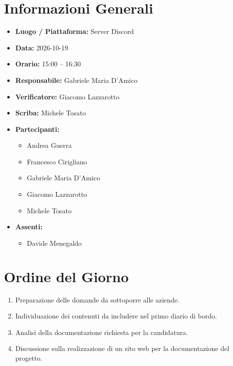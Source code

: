 \documentclass[11pt, a4paper]{article}
\newcommand{\DocDate}{2026-10-19}
\begin{document}
\section{Informazioni Generali}
\begin{itemize}
    \item \textbf{Luogo / Piattaforma:} Server Discord
    \item \textbf{Data:} \DocDate
    \item \textbf{Orario:} 15:00 -- 16:30
    \item \textbf{Responsabile:} Gabriele Maria D'Amico
    \item \textbf{Verificatore:} Giacomo Lazzarotto
    \item \textbf{Scriba:} Michele Tosato
    \item \textbf{Partecipanti:}
        \begin{itemize}
            \item Andrea Guerra
            \item Francesco Cirigliano
            \item Gabriele Maria D'Amico
            \item Giacomo Lazzarotto
            \item Michele Tosato
        \end{itemize}
    \item \textbf{Assenti:}
        \begin{itemize}
            \item Davide Menegaldo
        \end{itemize}
\end{itemize}

\clearpage

\section{Ordine del Giorno}
\begin{enumerate}
    \item Preparazione delle domande da sottoporre alle aziende.
    \item Individuazione dei contenuti da includere nel primo diario di bordo.
    \item Analisi della documentazione richiesta per la candidatura.
    \item Discussione sulla realizzazione di un sito web per la documentazione del progetto.
\end{enumerate}

\clearpage
\end{document}
